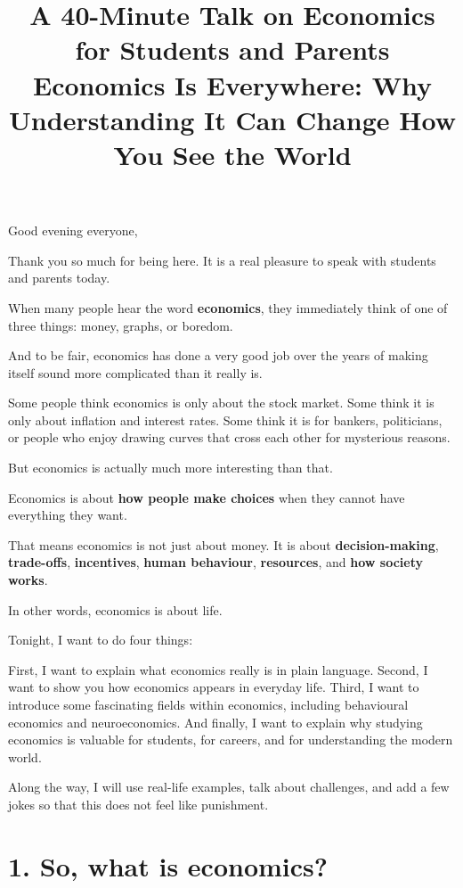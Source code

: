 \documentclass[12pt]{article}
\begin{document}
\title{\textbf{A 40-Minute Talk on Economics for Students and Parents}\\[0.5em]
\large Economics Is Everywhere: Why Understanding It Can Change How You See the World}
\author{}
\date{}
\maketitle

Good evening everyone,

Thank you so much for being here. It is a real pleasure to speak with students and parents today.

When many people hear the word \textbf{economics}, they immediately think of one of three things:  
money, graphs, or boredom.

And to be fair, economics has done a very good job over the years of making itself sound more complicated than it really is.

Some people think economics is only about the stock market.  
Some think it is only about inflation and interest rates.  
Some think it is for bankers, politicians, or people who enjoy drawing curves that cross each other for mysterious reasons.

But economics is actually much more interesting than that.

Economics is about \textbf{how people make choices} when they cannot have everything they want.

That means economics is not just about money.  
It is about \textbf{decision-making}, \textbf{trade-offs}, \textbf{incentives}, \textbf{human behaviour}, \textbf{resources}, and \textbf{how society works}.

In other words, economics is about life.

Tonight, I want to do four things:

First, I want to explain what economics really is in plain language.  
Second, I want to show you how economics appears in everyday life.  
Third, I want to introduce some fascinating fields within economics, including behavioural economics and neuroeconomics.  
And finally, I want to explain why studying economics is valuable for students, for careers, and for understanding the modern world.

Along the way, I will use real-life examples, talk about challenges, and add a few jokes so that this does not feel like punishment.

\section*{1. So, what is economics?}
\end{document}
